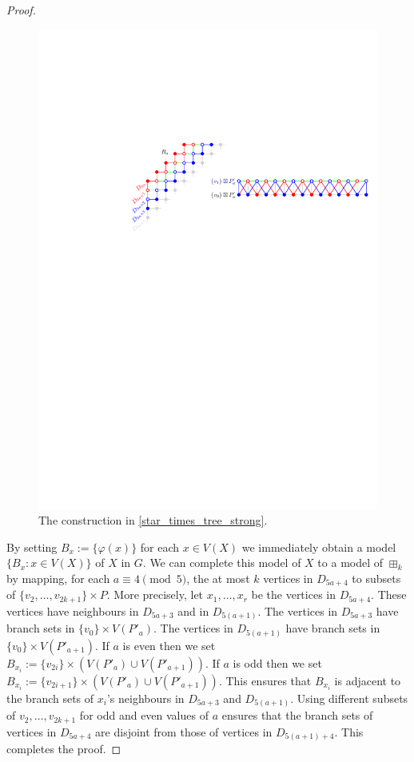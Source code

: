\documentclass{patmorin}
\theoremstyle{plain}
\theoremstyle{definition}
\begin{document}
\begin{proof}
  \begin{figure}[ht]
    \centering
    \includegraphics{figs/fh2.pdf}
    \caption{The construction in \cref{star_times_tree_strong}. }
    \label{fivehalves}
  \end{figure}

  By setting $B_x:=\{\varphi(x)\}$ for each $x\in V(X)$ we immediately obtain a model $\{B_x:x\in V(X)\}$ of $X$ in $G$.  We can complete this model of $X$ to a model of $\boxplus_k$ by mapping, for each $a\equiv 4\pmod 5$, the at most $k$ vertices in $D_{5a+4}$ to subsets of $\{v_2,\ldots,v_{2k+1}\}\times P$.  More precisely, let $x_1,\ldots,x_r$ be the vertices in $D_{5a+4}$.  These vertices have neighbours in $D_{5a+3}$ and in $D_{5(a+1)}$.  The vertices in $D_{5a+3}$ have branch sets in $\{v_0\}\times V(P'_a)$.  The vertices in $D_{5(a+1)}$ have branch sets in $\{v_0\}\times V(P'_{a+1})$.  If $a$ is even then we set $B_{x_i}:=\{v_{2i}\}\times (V(P'_a)\cup V(P'_{a+1}))$.  If $a$ is odd then we set $B_{x_i}:=\{v_{2i+1}\}\times (V(P'_a)\cup V(P'_{a+1}))$.  This ensures that $B_{x_i}$ is adjacent to the branch sets of $x_i$'s neighbours in $D_{5a+3}$ and $D_{5(a+1)}$.  Using different subsets of $v_2,\ldots,v_{2k+1}$ for odd and even values of $a$ ensures that the branch sets of vertices in $D_{5a+4}$ are disjoint from those of vertices in $D_{5(a+1)+4}$.  This completes the proof.
\end{proof}
  
\end{document}

